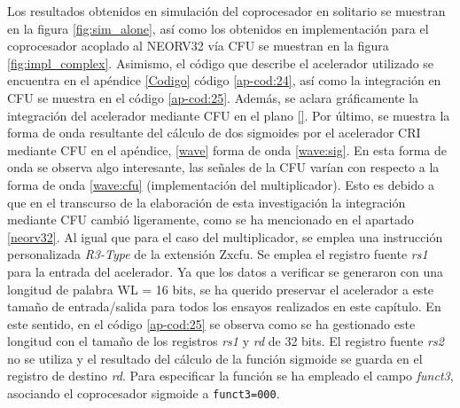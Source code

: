Los resultados obtenidos en simulación del coprocesador en solitario se muestran en la figura \ref{fig:sim_alone}, así como los obtenidos en implementación para el coprocesador acoplado al NEORV32 vía CFU se muestran en la figura \ref{fig:impl_complex}.
Asimismo, el código que describe el acelerador utilizado se encuentra en el apéndice \ref{Codigo} código \ref{ap-cod:24}, así como la integración en CFU se muestra en el código \ref{ap-cod:25}.
Además, se aclara gráficamente la integración del acelerador mediante CFU en el plano \ref{}. 
Por último, se muestra la forma de onda resultante del cálculo de dos sigmoides por el acelerador CRI mediante CFU en el apéndice, \ref{wave} forma de onda \ref{wave:sig}. 
En esta forma de onda se observa algo interesante, las señales de la CFU varían con respecto a la forma de onda \ref{wave:cfu} (implementación del multiplicador).
Esto es debido a que en el transcurso de la elaboración de esta investigación la integración mediante CFU cambió ligeramente, como se ha mencionado en el apartado \ref{neorv32}.
Al igual que para el caso del multiplicador, se emplea una instrucción personalizada \textit{R3-Type} de la extensión Zxcfu.
Se emplea el registro fuente \textit{rs1} para la entrada del acelerador.
Ya que los datos a verificar se generaron con una longitud de palabra WL = 16 bits, se ha querido preservar el acelerador a este tamaño de entrada/salida para todos los ensayos realizados en este capítulo.
En este sentido, en el código \ref{ap-cod:25} se observa como se ha gestionado este longitud con el tamaño de los registros \textit{rs1} y \textit{rd} de 32 bits. 
El registro fuente \textit{rs2} no se utiliza y el resultado del cálculo de la función sigmoide se guarda en el registro de destino \textit{rd}.
Para especificar la función se ha empleado el campo \textit{funct3}, asociando el coprocesador sigmoide a \texttt{funct3=000}.


